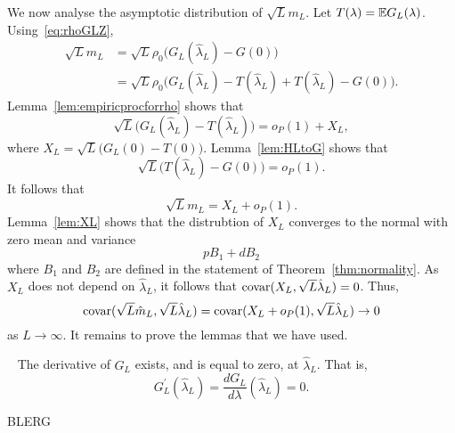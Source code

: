 \documentclass[journal]{IEEEtran}
\begin{document}
We now analyse the asymptotic distribution of $\sqrt{L} m_L$.  Let $T(\lambda) = {\mathbb E} G_L(\lambda)$.  Using~\eqref{eq:rhoGLZ},
\begin{align*}
\sqrt{L} m_L &= \sqrt{L} \rho_0 \big( G_L(\hat{\lambda}_L) - G(0) \big) \\
&= \sqrt{L} \rho_0 \big( G_L(\hat{\lambda}_L) - T(\hat{\lambda}_L) + T(\hat{\lambda}_L) - G(0) \big).
\end{align*}
Lemma~\ref{lem:empiricprocforrho} shows that 
\[
\sqrt{L}\big( G_L(\hat{\lambda}_L) - T(\hat{\lambda}_L)  \big) = o_P(1) + X_L,
\]
where $X_L = \sqrt{L}\big( G_L(0) - T(0)  \big)$.  Lemma~\ref{lem:HLtoG} shows that
\[
\sqrt{L}\big( T(\hat{\lambda}_L) - G(0) \big) = o_P(1).
\]
It follows that
\[
\sqrt{L} m_L =  X_L + o_P(1). 
\]
Lemma~\ref{lem:XL} shows that the distrubtion of $X_L$ converges to the normal with zero mean and variance
\[
 p B_1 + d B_2 
\]
where $B_1$ and $B_2$ are defined in the statement of Theorem~\ref{thm:normality}.  As $X_L$ does not depend on $\hat{\lambda}_L$, it follows that $\operatorname{covar}(X_L, \sqrt{L}\hat{\lambda}_L) = 0$.  Thus,
\[
\operatorname{covar}(\sqrt{L}\hat{m}_L, \sqrt{L}\hat{\lambda}_L) = \operatorname{covar}(X_L + o_P(1), \sqrt{L}\hat{\lambda}_L) \rightarrow 0
\]
as $L \rightarrow \infty$.  It remains to prove the lemmas that we have used.


\begin{lemma}~\label{lem:diffatlambdaL}
The derivative of $G_L$ exists, and is equal to zero, at $\hat{\lambda}_L$.  That is,
\[
G_L^\prime(\hat{\lambda}_L) = \frac{d G_L}{d \lambda}(\hat{\lambda}_L) = 0.
\]
\end{lemma}
\begin{IEEEproof}
BLERG
\end{IEEEproof}
\end{document}
